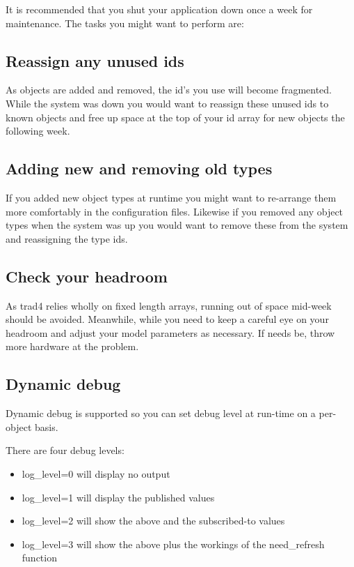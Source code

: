 \documentclass{report}
\begin{document}
It is recommended that you shut your application down once a week for maintenance. The tasks you might want to perform are:

\subsection{Reassign any unused ids}

As objects are added and removed, the id's you use will become fragmented. While the system was down you would want to reassign these unused ids to known objects and free up space at the top of your id array for new objects the following week.

\subsection{Adding new and removing old types}

If you added new object types at runtime you might want to re-arrange them more comfortably in the configuration files. Likewise if you removed any object types when the system was up you would want to remove these from the system and reassigning the type ids.

\subsection{Check your headroom}

As trad4 relies wholly on fixed length arrays, running out of space mid-week should be avoided.  Meanwhile, while you need to keep a careful eye on your headroom and adjust your model parameters as necessary. If needs be, throw more hardware at the problem.

\subsection{Dynamic debug}

Dynamic debug is supported so you can set debug level at run-time on a per-object basis. 

There are four debug levels:

\begin{itemize}
\item log_level=0 will display no output
\item log_level=1 will display the published values
\item log_level=2 will show the above and the subscribed-to values
\item log_level=3 will show the above plus the workings of the need_refresh function
\end{itemize}
\end{document}
